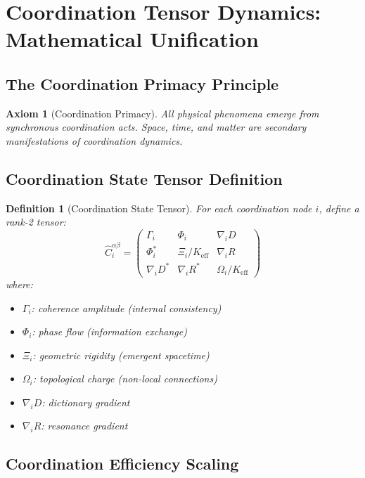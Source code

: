 \documentclass[11pt,a4paper]{article}
\newtheorem{axiom}{Axiom}
\newtheorem{definition}{Definition}
\begin{document}

\section{Coordination Tensor Dynamics: Mathematical Unification}
\label{sec:ctd-unification}

\subsection{The Coordination Primacy Principle}
\begin{axiom}[Coordination Primacy]
	All physical phenomena emerge from synchronous coordination acts. 
	Space, time, and matter are secondary manifestations of coordination dynamics.
\end{axiom}

\subsection{Coordination State Tensor Definition}

\begin{definition}[Coordination State Tensor]
	For each coordination node $i$, define a rank-2 tensor:
	\[
	\hat{C}_i^{\alpha\beta} = \begin{pmatrix}
		\Gamma_i & \Phi_i & \nabla_i D \\
		\Phi_i^* & \Xi_i/K_{\mathrm{eff}} & \nabla_i R \\
		\nabla_i D^* & \nabla_i R^* & \Omega_i/K_{\mathrm{eff}}
	\end{pmatrix}
	\]
	where:
	\begin{itemize}
		\item $\Gamma_i$: coherence amplitude (internal consistency)
		\item $\Phi_i$: phase flow (information exchange)  
		\item $\Xi_i$: geometric rigidity (emergent spacetime)
		\item $\Omega_i$: topological charge (non-local connections)
		\item $\nabla_i D$: dictionary gradient
		\item $\nabla_i R$: resonance gradient
	\end{itemize}
\end{definition}

\subsection{Coordination Efficiency Scaling}
\end{document}
